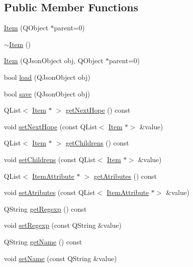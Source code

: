 \subsection*{Public Member Functions}
\begin{DoxyCompactItemize}
\item 
\hyperlink{class_item_aabd972d6d2b789c2ea8d83c127b9bfa6}{Item} (Q\+Object $\ast$parent=0)
\item 
\hyperlink{class_item_a11663c84075b78c3ae5e30fdfcd7c458}{$\sim$\+Item} ()
\item 
\hyperlink{class_item_abf5c29843b8d9106348c9fed7904a6cd}{Item} (Q\+Json\+Object obj, Q\+Object $\ast$parent=0)
\item 
bool \hyperlink{class_item_aa089e9749b9a19492d45bb02c2135b48}{load} (Q\+Json\+Object obj)
\item 
bool \hyperlink{class_item_a0922eea7bc56f3f87a134210b56dde2c}{save} (Q\+Json\+Object obj)
\item 
Q\+List$<$ \hyperlink{class_item}{Item} $\ast$ $>$ \hyperlink{class_item_a561400c0ac0bc9734b08878eaf5625ed}{get\+Next\+Hope} () const
\item 
void \hyperlink{class_item_aeb4b7f6ae49089c37b4e83b60cdec1fc}{set\+Next\+Hope} (const Q\+List$<$ \hyperlink{class_item}{Item} $\ast$$>$ \&value)
\item 
Q\+List$<$ \hyperlink{class_item}{Item} $\ast$ $>$ \hyperlink{class_item_a9b13c14f5684cf1bf9a085718bf5bb27}{get\+Childrens} () const
\item 
void \hyperlink{class_item_af6cc06c1af86eba7addaa1abf7034813}{set\+Childrens} (const Q\+List$<$ \hyperlink{class_item}{Item} $\ast$$>$ \&value)
\item 
Q\+List$<$ \hyperlink{class_item_attribute}{Item\+Attribute} $\ast$ $>$ \hyperlink{class_item_ad954d16c20b7f88ceaf67d584a025070}{get\+Atributes} () const
\item 
void \hyperlink{class_item_a7ab11dc5bc3eac9b3acdea2ec58bcd63}{set\+Atributes} (const Q\+List$<$ \hyperlink{class_item_attribute}{Item\+Attribute} $\ast$$>$ \&value)
\item 
Q\+String \hyperlink{class_item_a5ef326c2ff5f7836cce5b217ab86924f}{get\+Regexp} () const
\item 
void \hyperlink{class_item_a7745fe1a00ad454eaaa8416ff88ea869}{set\+Regexp} (const Q\+String \&value)
\item 
Q\+String \hyperlink{class_item_a926b576dfdb3a48d93d8eb6aeba6d64a}{get\+Name} () const
\item 
void \hyperlink{class_item_a4471207d9b41c03f59f8e8bd2c385cba}{set\+Name} (const Q\+String \&value)
$$
\end{DoxyCompactItemize}
